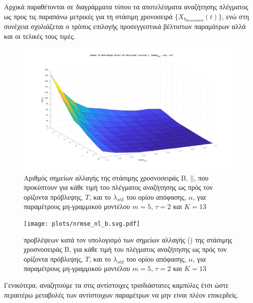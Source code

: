 Αρχικά παραθέτονται σε διαγράμματα τύπου  τα αποτελέσματα αναζήτησης πλέγματος ως προς τις παραπάνω μετρικές για τη στάσιμη χρονοσειρά $\{X_{b_{deseasoned}}(t)\}$, ενώ στη συνέχεια σχολιάζεται ο τρόπος επιλογής προσεγγεστικά βέλτιστων παραμάτρων αλλά και οι τελικές τους τιμές.

\begin{figure}[H]
    \begin{center}
        \includegraphics[width=\textwidth]{assets/images/plots/mcps_count_nl_b.svg.pdf}
        \caption{Αριθμός σημείων αλλαγής της στάσιμης χροσνοσειράς Β, $\vert$$\vert$, που προκύπτουν για κάθε τιμή του πλέγματος αναζήτησης ως πρός τον ορίζοντα πρόβλεψης, $T$, και το $\lambda_{std}$ του ορίου απόφασης, $\alpha$, για παραμέτρους μη-γραμμικού μοντέλου $m=5$, $\tau=2$ και $K=13$}
        \label{fig:mcps_count_nl_b}
    \end{center}
\end{figure}

\begin{figure}[H]
    \begin{center}
        \texttt{[image: plots/nrmse\_nl\_b.svg.pdf]}
        \caption{ προβλέψεων κατά τον υπολογισμό των σημείων αλλαγής () της στάσιμης χροσνοσειράς Β, για κάθε τιμή του πλέγματος αναζήτησης ως πρός τον ορίζοντα πρόβλεψης, $T$, και το $\lambda_{std}$ του ορίου απόφασης, $\alpha$, για παραμέτρους μη-γραμμικού μοντέλου $m=5$, $\tau=2$ και $K=13$}
        \label{fig:nrmse_nl_b}
    \end{center}
\end{figure}

\par Γενικότερα, αναζητούμε τα  στις αντίστοιχες τρισδιάστατες καμπύλες έτσι ώστε περαιτέρω μεταβολές των αντίστοιχων παραμέτρων να μην είναι πλέον επικερδείς.

